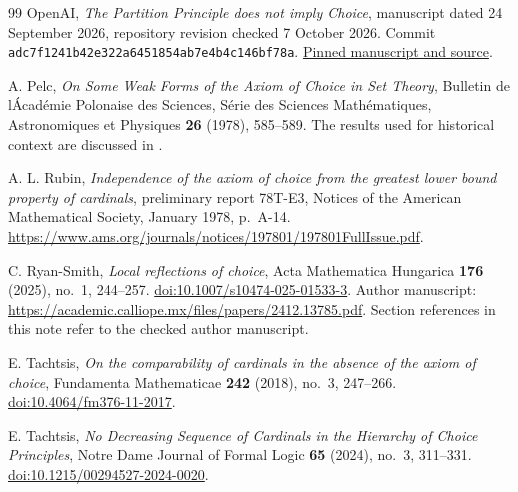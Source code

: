 \documentclass[11pt,a4paper]{article}
\theoremstyle{definition}
\theoremstyle{remark}
\begin{document}
\begin{thebibliography}{99}
 OpenAI, \emph{The Partition Principle does not imply Choice}, manuscript dated 24 September 2026, repository revision checked 7 October 2026. Commit \texttt{adc7f1241b42e322a6451854ab7e4b4c146bf78a}. \href{https://github.com/openai/math/tree/adc7f1241b42e322a6451854ab7e4b4c146bf78a/preprints/The-Partition-Principle-does-not-imply-Choice-September-24-2026}{Pinned manuscript and source}.

 A. Pelc, \emph{On Some Weak Forms of the Axiom of Choice in Set Theory}, Bulletin de l\'Acad\'emie Polonaise des Sciences, S\'erie des Sciences Math\'ematiques, Astronomiques et Physiques \textbf{26} (1978), 585--589. The results used for historical context are discussed in \cite[Section 10]{BK}.

 A. L. Rubin, \emph{Independence of the axiom of choice from the greatest lower bound property of cardinals}, preliminary report 78T-E3, Notices of the American Mathematical Society, January 1978, p.~A-14. \url{https://www.ams.org/journals/notices/197801/197801FullIssue.pdf}.

 C. Ryan-Smith, \emph{Local reflections of choice}, Acta Mathematica Hungarica \textbf{176} (2025), no.~1, 244--257. \href{https://doi.org/10.1007/s10474-025-01533-3}{doi:10.1007/s10474-025-01533-3}. Author manuscript: \url{https://academic.calliope.mx/files/papers/2412.13785.pdf}. Section references in this note refer to the checked author manuscript.

 E. Tachtsis, \emph{On the comparability of cardinals in the absence of the axiom of choice}, Fundamenta Mathematicae \textbf{242} (2018), no.~3, 247--266. \href{https://doi.org/10.4064/fm376-11-2017}{doi:10.4064/fm376-11-2017}.

 E. Tachtsis, \emph{No Decreasing Sequence of Cardinals in the Hierarchy of Choice Principles}, Notre Dame Journal of Formal Logic \textbf{65} (2024), no.~3, 311--331. \href{https://doi.org/10.1215/00294527-2024-0020}{doi:10.1215/00294527-2024-0020}.

\end{thebibliography}
\end{document}
